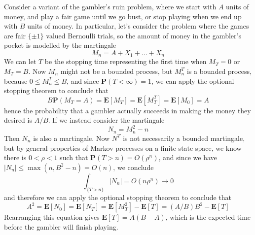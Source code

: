 \begin{example}
    Consider a variant of the gambler's ruin problem, where we start with $A$ units of money, and play a fair game until we go bust, or stop playing when we end up with $B$ units of money. In particular, let's consider the problem where the games are fair $\{ \pm 1 \}$ valued Bernoulli trials, so the amount of money in the gambler's pocket is modelled by the martingale
    \[ M_n = A + X_1 + \dots + X_n \]
    We can let $T$ be the stopping time representing the first time when $M_T = 0$ or $M_T = B$. Now $M_n$ might not be a bounded process, but $M_n^T$ is a bounded process, because $0 \leq M_n^T \leq B$, and since $\mathbf{P}(T < \infty) = 1$, we can apply the optional stopping theorem to conclude that
    \[ B \mathbf{P}(M_T = A) = \mathbf{E}[M_T] = \mathbf{E}[M^T_T] = \mathbf{E}[M_0] = A \]
    hence the probability that a gambler actually succeeds in making the money they desired is $A/B$. If we instead consider the martingale
    \[ N_n = M_n^2 - n \]
    Then $N_n$ is also a martingale. Now $N^T$ is not necessarily a bounded martingale, but by general properties of Markov processes on a finite state space, we know there is $0 < \rho < 1$ such that $\mathbf{P}(T > n) = O(\rho^n)$, and since we have $|N_n| \leq \max(n,B^2 - n) = O(n)$, we conclude
    \[ \int_{\{ T > n \}} |N_n| = O(n \rho^n) \to 0 \]
    and therefore we can apply the optional stopping theorem to conclude that
    \[ A^2 = \mathbf{E}[N_0] = \mathbf{E}[N_T] = \mathbf{E}[M_T^2] - \mathbf{E}[T] = (A/B) B^2 - \mathbf{E}[T] \]
    Rearranging this equation gives $\mathbf{E}[T] = A(B - A)$, which is the expected time before the gambler will finish playing.
\end{example}

